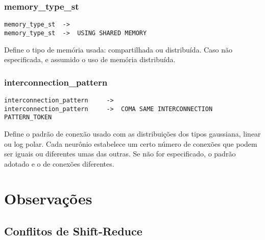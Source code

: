 \documentclass[a4paper,10pt]{article}
\begin{document}
	\subsubsection{memory\_type\_st}
		\begin{lstlisting}
memory_type_st	->	
memory_type_st	->	USING SHARED MEMORY
		\end{lstlisting}

Define o tipo de mem\'oria usada: compartilhada ou distribu\'ida. Caso n\~ao especificada, e assumido o uso de mem\'oria distribu\'ida.
\vspace{10mm}

	\subsubsection{interconnection\_pattern}
		\begin{lstlisting}
interconnection_pattern		->	
interconnection_pattern		->	COMA SAME INTERCONNECTION PATTERN_TOKEN
		\end{lstlisting}

Define o padr\~ao de conex\~ao usado com as distribui\c{c}\~oes dos tipos gaussiana, linear ou log polar. Cada neur\^onio estabelece um certo n\'umero de conex\~oes que podem ser iguais ou diferentes umas das outras. Se n\~ao for especificado, o padr\~ao adotado e o de conex\~oes diferentes.

\vspace{10mm}

\section{Observa\c{c}\~oes}
  \subsection{Conflitos de Shift-Reduce}
\end{document}
